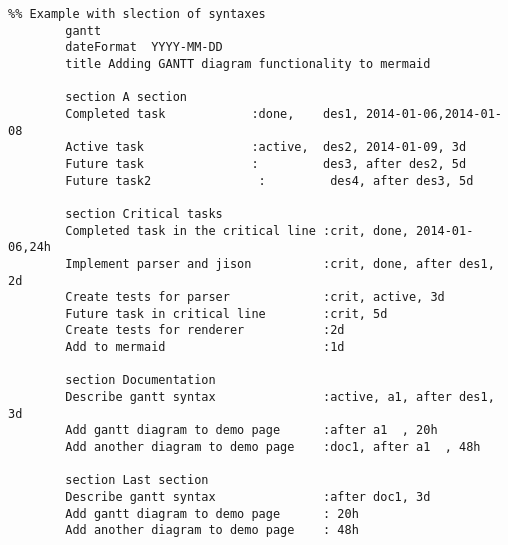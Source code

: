 \documentclass[]{article}
\begin{document}
\begin{verbatim}
%% Example with slection of syntaxes
        gantt
        dateFormat  YYYY-MM-DD
        title Adding GANTT diagram functionality to mermaid

        section A section
        Completed task            :done,    des1, 2014-01-06,2014-01-08
        Active task               :active,  des2, 2014-01-09, 3d
        Future task               :         des3, after des2, 5d
        Future task2               :         des4, after des3, 5d

        section Critical tasks
        Completed task in the critical line :crit, done, 2014-01-06,24h
        Implement parser and jison          :crit, done, after des1, 2d
        Create tests for parser             :crit, active, 3d
        Future task in critical line        :crit, 5d
        Create tests for renderer           :2d
        Add to mermaid                      :1d

        section Documentation
        Describe gantt syntax               :active, a1, after des1, 3d
        Add gantt diagram to demo page      :after a1  , 20h
        Add another diagram to demo page    :doc1, after a1  , 48h

        section Last section
        Describe gantt syntax               :after doc1, 3d
        Add gantt diagram to demo page      : 20h
        Add another diagram to demo page    : 48h
\end{verbatim}
\end{document}
